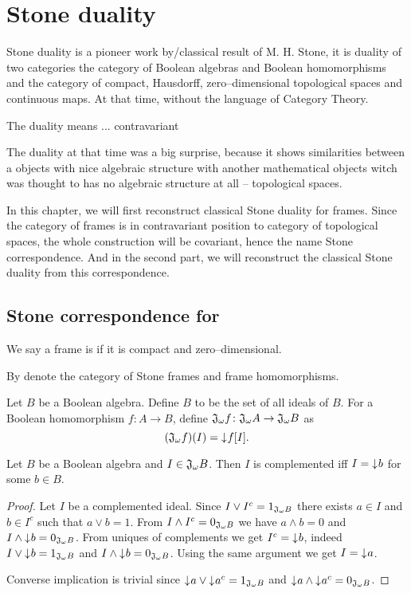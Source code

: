 \chapter{Stone duality}

Stone duality is a pioneer work by/classical result of M. H. Stone, it is duality of two categories the category of Boolean algebras and Boolean homomorphisms and the category of compact, Hausdorff, zero--dimensional topological spaces and continuous maps. At that time, without the language of Category Theory.

The duality means ... contravariant

The duality at that time was a big surprise, because it shows similarities between a objects with nice algebraic structure with another mathematical objects witch was thought to has no algebraic structure at all -- topological spaces.

In this chapter, we will first reconstruct classical Stone duality for frames. Since the category of frames is in contravariant position to category of topological spaces, the whole construction will be covariant, hence the name Stone correspondence. And in the second part, we will reconstruct the classical Stone duality from this correspondence.

\section{Stone correspondence for \StoneFrm}

\begin{definition}
    We say a frame is  if it is compact and zero--dimensional.

    By \DEF{\StoneFrm{}} denote the category of Stone frames and frame homomorphisms.
\end{definition}

\begin{definition}
    Let $B$ be a Boolean algebra. Define $B$ to be the set of all ideals of $B$.
    For a Boolean homomorphism $f\colon A \to B$, define $\mathfrak{J}_{\omega} f\colon \mathfrak{J}_{\omega} A \to \mathfrak{J}_{\omega} B$ as
    $$(\mathfrak{J}_{\omega} f)(I) = \mathord{\downarrow}\mkern1mu f[I].$$
\end{definition}

\begin{lemma}\label{p:complIdeal}
    Let $B$ be a Boolean algebra and $I \in \mathfrak{J}_{\omega} B$. Then $I$ is complemented iff $I = \mathord{\downarrow}\mkern1mu b$ for some $b \in B$.
\end{lemma}
\begin{proof}
    Let $I$ be a complemented ideal. Since $I \vee I^c = 1_{\mathfrak{J}_{\omega} B}$ there exists $a \in I$ and $b \in I^c$ such that $a \vee b = 1$. From $I \wedge I^c = 0_{\mathfrak{J}_{\omega} B}$ we have $a \wedge b = 0$ and $I \wedge \mathord{\downarrow}\mkern1mu b = 0_{\mathfrak{J}_{\omega} B}$.
    From uniques of complements we get $I^c = \mathord{\downarrow}\mkern1mu b$, indeed $I \vee \mathord{\downarrow}\mkern1mu b = 1_{\mathfrak{J}_{\omega} B}$ and $I \wedge \mathord{\downarrow}\mkern1mu b = 0_{\mathfrak{J}_{\omega} B}$. Using the same argument we get $I = \mathord{\downarrow}\mkern1mu a$.

    Converse implication is trivial since $\mathord{\downarrow}\mkern1mu a \vee \mathord{\downarrow}\mkern1mu a^c = 1_{\mathfrak{J}_{\omega} B}$ and $\mathord{\downarrow}\mkern1mu a \wedge \mathord{\downarrow}\mkern1mu a^c = 0_{\mathfrak{J}_{\omega} B}$.
\end{proof}

